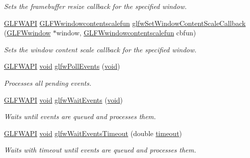 \begin{DoxyCompactItemize}
\begin{DoxyCompactList}\small\item\em Sets the framebuffer resize callback for the specified window. \end{DoxyCompactList}\item 
\mbox{\hyperlink{glfw3_8h_a56da5036b2cc259351ae22fd6439bb47}{G\+L\+F\+W\+A\+PI}} \mbox{\hyperlink{group__window_ga1da46b65eafcc1a7ff0adb8f4a7b72fd}{G\+L\+F\+Wwindowcontentscalefun}} \mbox{\hyperlink{group__window_ga51dd7f08ae0ad287b2fe97b2f835e186}{glfw\+Set\+Window\+Content\+Scale\+Callback}} (\mbox{\hyperlink{group__window_ga3c96d80d363e67d13a41b5d1821f3242}{G\+L\+F\+Wwindow}} $\ast$window, \mbox{\hyperlink{group__window_ga1da46b65eafcc1a7ff0adb8f4a7b72fd}{G\+L\+F\+Wwindowcontentscalefun}} cbfun)
\begin{DoxyCompactList}\small\item\em Sets the window content scale callback for the specified window. \end{DoxyCompactList}\item 
\mbox{\hyperlink{glfw3_8h_a56da5036b2cc259351ae22fd6439bb47}{G\+L\+F\+W\+A\+PI}} \mbox{\hyperlink{glad_8h_a950fc91edb4504f62f1c577bf4727c29}{void}} \mbox{\hyperlink{group__window_ga872d16e4c77f58c0436f356255920cfc}{glfw\+Poll\+Events}} (\mbox{\hyperlink{glad_8h_a950fc91edb4504f62f1c577bf4727c29}{void}})
\begin{DoxyCompactList}\small\item\em Processes all pending events. \end{DoxyCompactList}\item 
\mbox{\hyperlink{glfw3_8h_a56da5036b2cc259351ae22fd6439bb47}{G\+L\+F\+W\+A\+PI}} \mbox{\hyperlink{glad_8h_a950fc91edb4504f62f1c577bf4727c29}{void}} \mbox{\hyperlink{group__window_ga6e042d05823c11e11c7339b81a237738}{glfw\+Wait\+Events}} (\mbox{\hyperlink{glad_8h_a950fc91edb4504f62f1c577bf4727c29}{void}})
\begin{DoxyCompactList}\small\item\em Waits until events are queued and processes them. \end{DoxyCompactList}\item 
\mbox{\hyperlink{glfw3_8h_a56da5036b2cc259351ae22fd6439bb47}{G\+L\+F\+W\+A\+PI}} \mbox{\hyperlink{glad_8h_a950fc91edb4504f62f1c577bf4727c29}{void}} \mbox{\hyperlink{group__window_ga05223a0a4c5e50f10f289e60398153aa}{glfw\+Wait\+Events\+Timeout}} (double \mbox{\hyperlink{glad_8h_ad29bb0d8468b264a4e3d9204366cfaab}{timeout}})
\begin{DoxyCompactList}\small\item\em Waits with timeout until events are queued and processes them. \end{DoxyCompactList}\item 

\end{DoxyCompactItemize}
